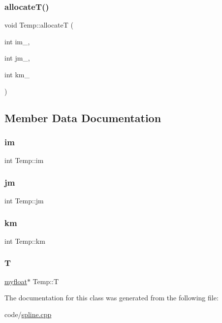 \subsubsection{\texorpdfstring{allocate\+T()}{allocateT()}}
{\footnotesize\ttfamily void Temp\+::allocateT (\begin{DoxyParamCaption}\item[{int}]{im\+\_\+,  }\item[{int}]{jm\+\_\+,  }\item[{int}]{km\+\_\+ }\end{DoxyParamCaption})\hspace{0.3cm}{\ttfamily [inline]}}



\subsection{Member Data Documentation}
\mbox{\label{classTemp_a2e7dc5e9a21b8f12c03ec22e1bcb60e2}} 
\subsubsection{\texorpdfstring{im}{im}}
{\footnotesize\ttfamily int Temp\+::im}

\mbox{\label{classTemp_ab953aa045fbf74f31fe75954951d91e1}} 
\subsubsection{\texorpdfstring{jm}{jm}}
{\footnotesize\ttfamily int Temp\+::jm}

\mbox{\label{classTemp_a937fbafc62103f16ba9efa38c40c1be5}} 
\subsubsection{\texorpdfstring{km}{km}}
{\footnotesize\ttfamily int Temp\+::km}

\mbox{\label{classTemp_a1423b2032708c9aa843847ab189d3d38}} 
\subsubsection{\texorpdfstring{T}{T}}
{\footnotesize\ttfamily \hyperlink{param_8h_a5f097c9f3873af7be7fc156e6a06ca5e}{myfloat}$\ast$ Temp\+::T}



The documentation for this class was generated from the following file\+:\begin{DoxyCompactItemize}
\item 
code/\hyperlink{spline_8cpp}{spline.\+cpp}\end{DoxyCompactItemize}
